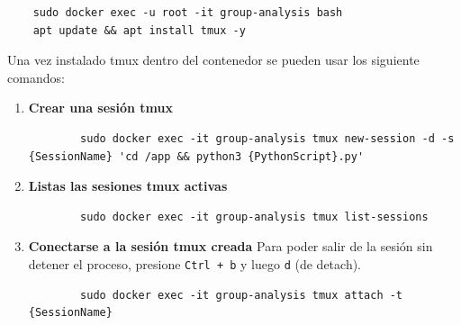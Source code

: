 \begin{lstlisting}
	sudo docker exec -u root -it group-analysis bash
	apt update && apt install tmux -y
\end{lstlisting}

Una vez instalado tmux dentro del contenedor se pueden usar los siguiente comandos:
\begin{enumerate}
	\item \textbf{Crear una sesión tmux}
	\begin{lstlisting}
		sudo docker exec -it group-analysis tmux new-session -d -s {SessionName} 'cd /app && python3 {PythonScript}.py'
	\end{lstlisting}
	
	\item \textbf{Listas las sesiones tmux activas}
	\begin{lstlisting}
		sudo docker exec -it group-analysis tmux list-sessions
	\end{lstlisting}
	
	\item \textbf{Conectarse a la sesión tmux creada} Para poder salir de la sesión sin detener el proceso, presione \texttt{Ctrl + b} y luego \texttt{d} (de detach).
	\begin{lstlisting}
		sudo docker exec -it group-analysis tmux attach -t {SessionName}
	\end{lstlisting}
\end{enumerate}

